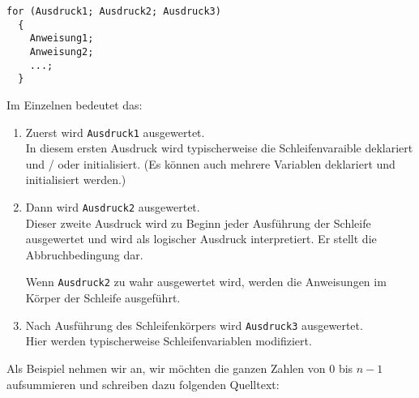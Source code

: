 \begin{minipage}{\linewidth}
\begin{lstlisting}[caption={for Schleife}, belowcaptionskip=0.3em]
for (Ausdruck1; Ausdruck2; Ausdruck3)
  {
    Anweisung1;
    Anweisung2;
    ...;
  }
\end{lstlisting}
\end{minipage}
Im Einzelnen bedeutet das:
\begin{enumerate}
\item Zuerst wird \texttt{Ausdruck1} ausgewertet.\\
  In diesem ersten Ausdruck wird typischerweise die Schleifenvaraible deklariert und / oder initialisiert.
  (Es können auch mehrere Variablen deklariert und initialisiert werden.)
\item Dann wird \texttt{Ausdruck2} ausgewertet.\\
  Dieser zweite Ausdruck wird zu Beginn jeder Ausführung der Schleife ausgewertet und wird als logischer Ausdruck interpretiert.
  Er stellt die Abbruchbedingung dar.

  Wenn \texttt{Ausdruck2} zu wahr ausgewertet wird, werden die Anweisungen im Körper der Schleife ausgeführt. 
\item Nach Ausführung des Schleifenkörpers wird \texttt{Ausdruck3} ausgewertet.\\
  Hier werden typischerweise Schleifenvariablen modifiziert.
\end{enumerate}
Als Beispiel nehmen wir an, wir möchten die ganzen Zahlen von $0$ bis $n-1$ aufsummieren und schreiben dazu folgenden Quelltext:


